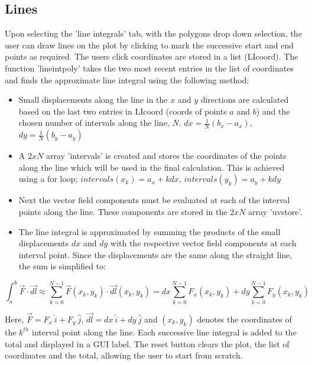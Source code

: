 \documentclass[12pt]{report}
\begin{document}
\subsection{Lines}

Upon selecting the 'line integrals' tab, with the polygons drop down selection, the user can draw lines on the plot by clicking to mark the successive start and end points as required. The users click coordinates are stored in a list (LI\textunderscore coord). The function 'line\textunderscore int\textunderscore poly' takes the two most recent entries in the list of coordinates and finds the approximate line integral using the following method:

\begin{itemize}
	\item Small displacements along the line in the $x$ and $y$ directions are calculated based on the last two entries in LI\textunderscore coord (coords of points $a$ and $b$) and the chosen number of intervals along the line, $N$. $dx = \frac{1}{N} (b_x - a_x)$,  $dy = \frac{1}{N} (b_y - a_y)$
	\item A $2xN$ array 'intervals' is created and stores the coordinates of the points along the line which will be used in the final calculation. This is achieved using a for loop; $intervals(x_k) = a_x + k dx$, $intervals(y_k) = a_y + k dy$
	\item Next the vector field components must be evaluated at each of the interval points along the line. These components are stored in the $2xN$ array 'uv\textunderscore store'. 
	\item The line integral is approximated by summing the products of the small displacements $dx$ and $dy$ with the respective vector field components at each interval point. Since the displacements are the same along the straight line, the sum is simplified to:
\end{itemize}

\begin{equation}
	\int_{a}^{b} \vec{F} \cdot \vec{dl} \approx \sum_{k=0}^{N-1} \vec{F}(x_k,y_k) \cdot \vec{dl}(x_k,y_k) = dx \sum_{k=0}^{N-1} F_x(x_k,y_k) + dy \sum_{k=0}^{N-1} F_y(x_k,y_k)
\end{equation}

Here, $\vec{F} = F_x \ \hat{i} + F_y \ \hat{j}$, $\vec{dl} = dx \ \hat{i} + dy \ \hat{j}$ and $(x_k,y_k)$ denotes the coordinates of the $k^{th}$ interval point along the line. Each successive line integral is added to the total and displayed in a GUI label. The reset button clears the plot, the list of coordinates and the total, allowing the user to start from scratch.
\end{document}
